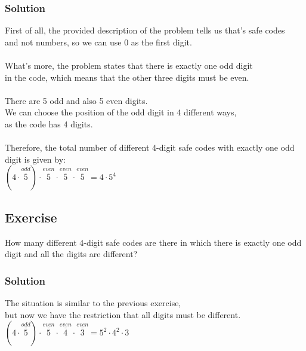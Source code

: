 \documentclass{article}
\begin{document}
\subsubsection*{Solution}
First of all, the provided description of the problem tells us that's safe codes\\
and not numbers, so we can use 0 as the first digit.\\
\\
What's more, the problem states that there is exactly one odd digit\\
in the code, which means that the other three digits must be even.\\
\\
There are 5 odd and also 5 even digits.
\\
We can choose the position of the odd digit in 4 different ways,\\
as the code has 4 digits.\\
\\
Therefore, the total number of different 4-digit safe codes with exactly one odd digit is given by:\\
$(4 \cdot \overset{odd}{\overline{5}}) \cdot \overset{even}{\overline{5}} \cdot \overset{even}{\overline{5}} \cdot \overset{even}{\overline{5}} = 4 \cdot 5^4$
\subsection{Exercise}
How many different 4-digit safe codes are there in which there is exactly one odd digit and all the digits are different?
\subsubsection*{Solution}
The situation is similar to the previous exercise,\\
but now we have the restriction that all digits must be different.\\
$(4 \cdot \overset{odd}{\overline{5}}) \cdot \overset{even}{\overline{5}} \cdot \overset{even}{\overline{4}} \cdot \overset{even}{\overline{3}} = 5^2 \cdot 4^2 \cdot 3$
\end{document}
